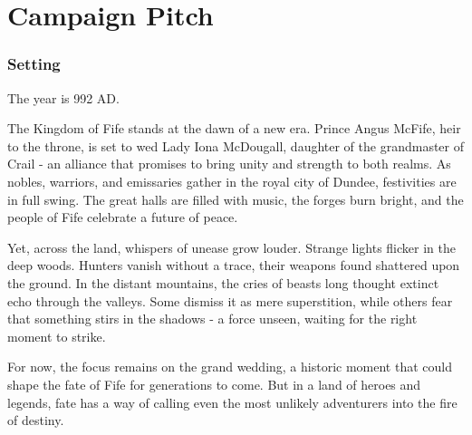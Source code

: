 \chapter*{Campaign Pitch}
\subsection*{Setting}
{\entryfont The year is 992 AD.

The Kingdom of Fife stands at the dawn of a new era. Prince Angus McFife, heir to the throne, is set to wed Lady Iona McDougall, daughter of the grandmaster of Crail - an alliance that promises to bring unity and strength to both realms. As nobles, warriors, and emissaries gather in the royal city of Dundee, festivities are in full swing. The great halls are filled with music, the forges burn bright, and the people of Fife celebrate a future of peace.

Yet, across the land, whispers of unease grow louder. Strange lights flicker in the deep woods. Hunters vanish without a trace, their weapons found shattered upon the ground. In the distant mountains, the cries of beasts long thought extinct echo through the valleys. Some dismiss it as mere superstition, while others fear that something stirs in the shadows - a force unseen, waiting for the right moment to strike.

For now, the focus remains on the grand wedding, a historic moment that could shape the fate of Fife for generations to come. But in a land of heroes and legends, fate has a way of calling even the most unlikely adventurers into the fire of destiny.}
